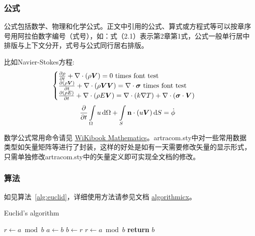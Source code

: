 \subsubsection{公式}
公式包括数学、物理和化学公式。正文中引用的公式、算式或方程式等可以按章序号用阿拉伯数字编号（式号），如：式（2.1）表示第2章第1式，公式一般单行居中排版与上下文分开，式号与公式同行居右排版。

比如Navier-Stokes方程:
\begin{equation} \label{eq:ns}
    \begin{cases}
        \frac{\partial \rho}{\partial t} + \nabla\cdot(\rho\Vector{V}) = 0 \ \mathrm{times\ font\ test}\\
        \frac{\partial (\rho\Vector{V})}{\partial t} + \nabla\cdot(\rho\Vector{V}\Vector{V}) = \nabla\cdot\Tensor{\sigma} \ \text{times font test}\\
        \frac{\partial (\rho E)}{\partial t} + \nabla\cdot(\rho E\Vector{V}) = \nabla\cdot(k\nabla T) + \nabla\cdot(\Tensor{\sigma}\cdot\Vector{V})
    \end{cases}
\end{equation}
\begin{equation}
    \frac{\partial }{\partial t}\int\limits_{\Omega} u \, \mathrm{d}\Omega + \int\limits_{S} \boldsymbol{\mathbf{n}}\cdot(u\boldsymbol{V}) \, \mathrm{d}S = \dot{\phi}
\end{equation}

数学公式常用命令请见 \href{https://en.wikibooks.org/wiki/LaTeX/Mathematics}{WiKibook Mathematics}。artracom.sty中对一些常用数据类型如矢量矩阵等进行了封装，这样的好处是如有一天需要修改矢量的显示形式，只需单独修改artracom.sty中的矢量定义即可实现全文档的修改。

\subsubsection{算法}

如见算法~\ref{alg:euclid}，详细使用方法请参见文档 \href{https://ctan.org/pkg/algorithmicx?lang=en}{algorithmicx}。

\begin{algorithm}[!htbp]
    \small
    \caption{Euclid's algorithm}\label{alg:euclid}
    \begin{algorithmic}[1]
        \State $r\gets a\bmod b$
        \State $a\gets b$
        \State $b\gets r$
        \State $r\gets a\bmod b$
        \EndWhile\label{euclidendwhile}
        \State \textbf{return} $b$
        \EndProcedure
    \end{algorithmic}
\end{algorithm}


